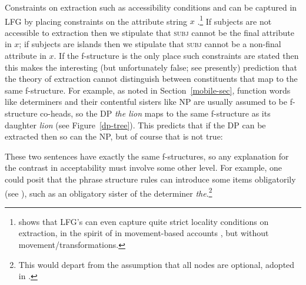 \begin{sloppypar} 
Constraints on extraction such as accessibility conditions and   can be captured in LFG by placing constraints on the attribute string \ensuremath{x} \citep[Chapter~17]{dalrymple;ea19}.\footnote{\citet{asudeh-lpr} shows that LFG's  \citep[225--230]{dalrymple;ea19} can even capture quite strict locality conditions on extraction, in the spirit of  in movement-based accounts \citep{Chomsky73a,Chomsky77a-u}, but without movement/transformations.} If subjects are not accessible to extraction then we stipulate that \textsc{subj} cannot be the final attribute in \ensuremath{x}; if subjects are islands then we stipulate that \textsc{subj} cannot be a non-final attribute in \ensuremath{x}.  If the f-structure is the only place such constraints are stated then 
this makes the interesting (but unfortunately false; see presently) prediction that the theory of extraction cannot distinguish between constituents that map to the same f-structure.  For example, as noted in Section~\ref{mobile-sec}, function words like determiners and their contentful sisters like NP are usually assumed to be f-structure co-heads, so the DP \textit{the lion} maps to the same f-structure as its daughter \textit{lion} (see  Figure~\ref{dp-tree}).  This predicts that if the DP can be extracted then so can the NP, but of course that is not true:
\end{sloppypar}

\begin{exe} 
\ex	\label{nope}
\begin{xlist}
\end{xlist}
\end{exe}
These two sentences have exactly the same f-structures, so any explanation for the contrast in acceptability must involve some other level.  For example, one could posit that the phrase structure rules can introduce some items obligatorily (see \citealt[239]{snijders15}), such as an obligatory sister of the determiner \textit{the}.\footnote{This would depart from the assumption that all nodes are optional, adopted in \citet{BATW2016a}.} 


%

